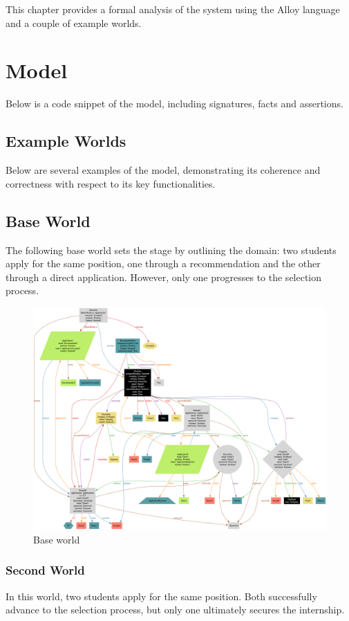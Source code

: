 This chapter provides a formal analysis of the system using the Alloy language and a couple of example worlds.

\section{Model}
Below is a code snippet of the model, including signatures, facts and assertions.



\subsection{Example Worlds}
Below are several examples of the model, demonstrating its coherence and correctness with respect to its key functionalities.

\subsection{Base World}
The following base world sets the stage by outlining the domain: two students apply for the same position, one through a recommendation and the other through a direct application. However, only one progresses to the selection process.

\begin{figure}[h]
    \centering
    \includegraphics[width=16cm]{images/worlds/base.png}
    \caption{Base world}
\end{figure}

\subsubsection{Second World}
In this world, two students apply for the same position. Both successfully advance to the selection process, but only one ultimately secures the internship.

